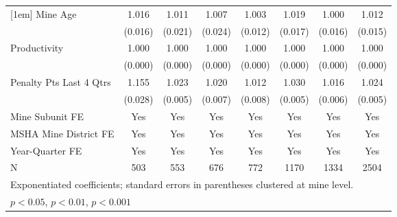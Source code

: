 {\begin{tabular}{l*{7}{c}}
[1em]
Mine Age                 &       1.016         &       1.011         &       1.007         &       1.003         &       1.019         &       1.000         &       1.012         \\
                         &     (0.016)         &     (0.021)         &     (0.024)         &     (0.012)         &     (0.017)         &     (0.016)         &     (0.015)         \\
[1em]
Productivity             &       1.000         &       1.000         &       1.000         &       1.000         &       1.000         &       1.000         &       1.000         \\
                         &     (0.000)         &     (0.000)         &     (0.000)         &     (0.000)         &     (0.000)         &     (0.000)         &     (0.000)         \\
[1em]
Penalty Pts Last 4 Qtrs  &       1.155\sym{***}&       1.023\sym{***}&       1.020\sym{**} &       1.012         &       1.030\sym{***}&       1.016\sym{**} &       1.024\sym{***}\\
                         &     (0.028)         &     (0.005)         &     (0.007)         &     (0.008)         &     (0.005)         &     (0.006)         &     (0.005)         \\
[1em]
Mine Subunit FE          &         Yes         &         Yes         &         Yes         &         Yes         &         Yes         &         Yes         &         Yes         \\
[1em]
MSHA Mine District FE    &         Yes         &         Yes         &         Yes         &         Yes         &         Yes         &         Yes         &         Yes         \\
[1em]
Year-Quarter FE          &         Yes         &         Yes         &         Yes         &         Yes         &         Yes         &         Yes         &         Yes         \\
\hline
N                        &         503         &         553         &         676         &         772         &        1170         &        1334         &        2504         \\
\hline\hline
\multicolumn{8}{l}{\footnotesize Exponentiated coefficients; standard errors in parentheses clustered at mine level.}\\
\multicolumn{8}{l}{\footnotesize \sym{*} \(p<0.05\), \sym{**} \(p<0.01\), \sym{***} \(p<0.001\)}\\
\end{tabular}
}
